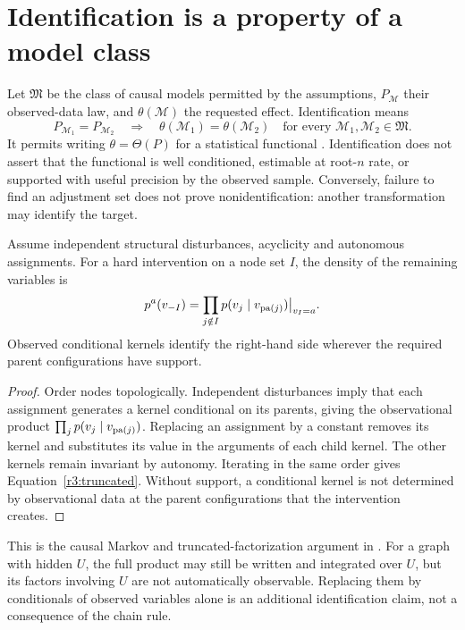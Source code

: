 \section{Identification is a property of a model class}
\label{r3:identification}
Let $\mathfrak M$ be the class of causal models permitted by the assumptions,
$P_{\mathcal M}$ their observed-data law, and $\theta(\mathcal M)$ the
requested effect. Identification means
\begin{equation}
 P_{\mathcal M_1}=P_{\mathcal M_2}
 \quad\Longrightarrow\quad
 \theta(\mathcal M_1)=\theta(\mathcal M_2)
 \quad\text{for every }\mathcal M_1,\mathcal M_2\in\mathfrak M.
 \label{r3:id-definition}
\end{equation}
It permits writing $\theta=\Theta(P)$ for a statistical functional
\citep[Definition 2]{pearl2009}. Identification does not assert that the
functional is well conditioned, estimable at root-$n$ rate, or supported
with useful precision by the observed sample. Conversely, failure to find
an adjustment set does not prove nonidentification: another transformation
may identify the target.

\begin{proposition}
Assume independent structural disturbances, acyclicity and autonomous
assignments. For a hard intervention on a node set $I$, the density of the
remaining variables is
\begin{equation}
 p^a(v_{-I})=\prod_{j\notin I}p(v_j\mid v_{\operatorname{pa}(j)})\big|_{v_I=a}.
 \label{r3:truncated}
\end{equation}
Observed conditional kernels identify the right-hand side wherever the
required parent configurations have support.
\end{proposition}
\begin{proof}
Order nodes topologically. Independent disturbances imply that each
assignment generates a kernel conditional on its parents, giving the
observational product $\prod_j p(v_j\mid v_{\operatorname{pa}(j)})$. Replacing an
assignment by a constant removes its kernel and substitutes its value in
the arguments of each child kernel. The other kernels remain invariant
by autonomy. Iterating in the same order gives Equation~\eqref{r3:truncated}.
Without support, a conditional kernel is not determined by observational
data at the parent configurations that the intervention creates.
\end{proof}
This is the causal Markov and truncated-factorization argument in
\citet[Theorem 1 and Corollary 1]{pearl2009}. For a graph with hidden $U$,
the full product may still be written and integrated over $U$, but its
factors involving $U$ are not automatically observable. Replacing them by
conditionals of observed variables alone is an additional identification
claim, not a consequence of the chain rule.

